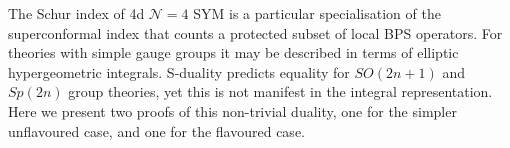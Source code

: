 The Schur index of 4d $\mathcal{N}=4$ SYM is a particular specialisation of the
superconformal index that counts a protected subset of local BPS operators. For
theories with simple gauge groups it may be described in terms of elliptic
hypergeometric integrals. S-duality predicts equality for $SO(2n+1)$ and
$Sp(2n)$ group theories, yet this is not manifest in the integral
representation. Here we present two proofs of this non-trivial duality, one for
the simpler unflavoured case, and one for the flavoured case.
